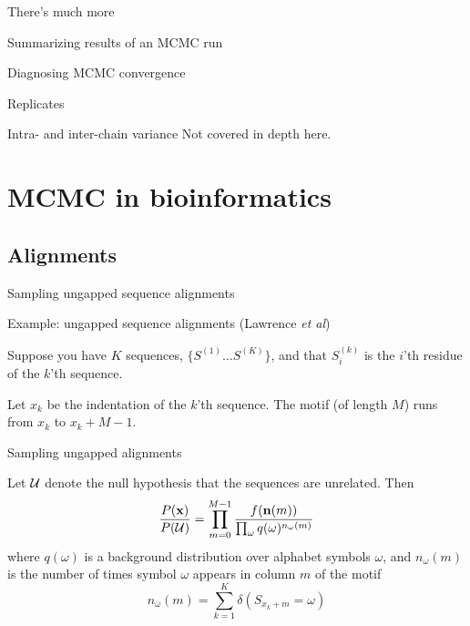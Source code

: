 \documentclass{beamer}
\begin{document}
\begin{frame}{There's much more}

\itemb
\item Summarizing results of an MCMC run
\item Diagnosing MCMC convergence
\itemb
\item Replicates
\item Intra- and inter-chain variance
\iteme
\iteme
Not covered in depth here.

\end{frame}


\section{MCMC in bioinformatics}

\subsection{Alignments}

\begin{frame}{Sampling ungapped sequence alignments}

\itemb
\item Example: ungapped sequence alignments (Lawrence {\em et al})
 \itemb
 \item Suppose you have $K$ sequences, $\{ S^{(1)} \ldots S^{(K)} \}$, and that $S^{(k)}_i$ is the $i$'th residue of the $k$'th sequence.
 \item Let $x_k$ be the indentation of the $k$'th sequence. The motif (of length $M$) runs from $x_k$ to $x_k+M-1$.
 \iteme
\iteme

\end{frame}


\begin{frame}{Sampling ungapped alignments}

\itemb
 \item Let ${\cal U}$ denote the null hypothesis that the sequences are unrelated. Then
\[
\frac{P({\bf x})}{P({\cal U})} = \prod_{m=0}^{M-1} \frac{f({\bf n}(m))}{\prod_\omega q(\omega)^{n_\omega(m)}}
\]
where $q(\omega)$ is a background distribution over alphabet symbols $\omega$, and $n_{\omega}(m)$ is the number of times symbol $\omega$ appears in column $m$ of the motif
\[
n_{\omega}(m) = \sum_{k=1}^K \delta(S_{x_k + m} = \omega)
\]
\iteme

\end{frame}
\end{document}
